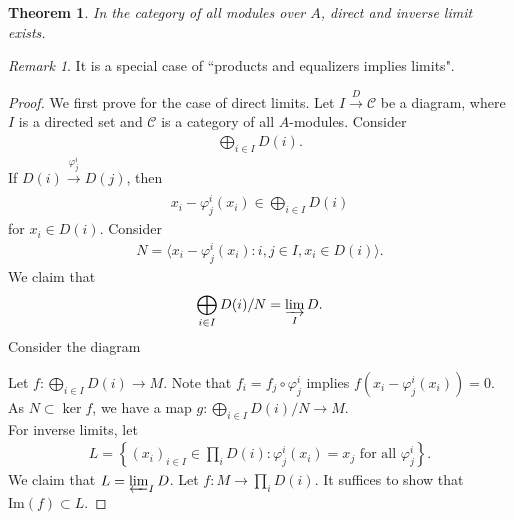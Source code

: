 \documentclass[12pt]{report}
\theoremstyle{plain}
\newtheorem{theorem}{Theorem}[section]
\theoremstyle{remark}
\newtheorem*{remark}{Remark}
\theoremstyle{definition}
\begin{document}
\begin{theorem}
    In the category of all modules over $A$, direct and inverse limit exists.
\end{theorem}
\begin{remark}
    It is a special case of ``products and equalizers implies limits".
\end{remark}
\begin{proof}
    We first prove for the case of direct limits. Let $I\xrightarrow{D}\mathcal{C}$ be a diagram, where $I$ is a directed set and $\mathcal{C}$ is a category of all $A$-modules. Consider
    \begin{align*}
        \bigoplus_{i\in I} D(i).
    \end{align*}
    If $D(i)\xrightarrow[]{\varphi^i_j}D(j)$, then
    \begin{align*}
        x_i-\varphi^i_j(x_i)\in \bigoplus_{i\in I} D(i)
    \end{align*}
    for $x_i\in D(i)$. Consider
    \begin{align*}
        N=\langle x_i-\varphi^i_j(x_i):i,j\in I,x_i\in D(i)\rangle.
    \end{align*}
    We claim that
    \begin{align*}
        \bigoplus_{i\in I} D(i)/N=\varinjlim_I D.
    \end{align*}
    Consider the diagram
    \begin{figure}[H]
        \centering
    \end{figure}
    \noindent Let $f:\bigoplus_{i\in I} D(i)\to M$. Note that $f_i=f_j\circ\varphi^i_j$ implies $f(x_i-\varphi^i_j(x_i))=0$. As $N\subset \ker f$, we have a map $g:\bigoplus_{i\in I}D(i)/N\to M$. \\
    For inverse limits, let
    \begin{align*}
        L=\left\{(x_i)_{i\in I}\in\prod_i D(i):\varphi^i_j(x_i)=x_j\text{ for all }\varphi^i_j\right\}.
    \end{align*}
    We claim that $L=\varprojlim_I D$. Let $f:M\to \prod_i D(i)$. It suffices to show that $\mathrm{Im}(f)\subset L$.
\end{proof}
\end{document}
